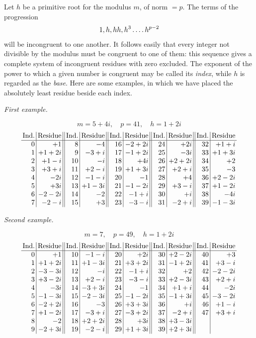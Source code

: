 \newpage
{}
Let $h$ be a primitive root for the modulus $m$, of norm $=p$. The terms of the progression
\[
1,h,hh,h^3\mathinner{.\,.\,.\,.} h^{p-2}
\]
will be incongruent to one another. It follows easily that every integer not divisible by the modulus must be congruent to one of them: this sequence gives a complete system of incongruent residues with zero excluded. The exponent of the power to which a given number is congruent may be called its \emph{index}, while $h$ is regarded as the \emph{base}. Here are some examples, in which we have placed the absolutely least residue beside each index.

\begin{center}\emph{First example.}\end{center}
\[
m=5+4i,\quad p=41,\quad h=1+2i
\]
\begingroup\small
\[
\setlength{\arraycolsep}{2pt}
\begin{array}{r|r||r|r||r|r||r|r||r|r}
\text{Ind.}&\text{Residue}&\text{Ind.}&\text{Residue}&\text{Ind.}&\text{Residue}&\text{Ind.}&\text{Residue}&\text{Ind.}&\text{Residue}\\\hline
0&+1&8&-4&16&-2+2i&24&+2i&32&+1+i\\
1&+1+2i&9&-3+i&17&-1+2i&25&-3i&33&+1+3i\\
2&+1-i&10&-i&18&+4i&26&+2+2i&34&+2\\
3&+3+i&11&+2-i&19&+1+3i&27&+2+i&35&-3\\
4&-2i&12&-1-i&20&-1&28&+4&36&+2-2i\\
5&+3i&13&+1-3i&21&-1-2i&29&+3-i&37&+1-2i\\
6&-2-2i&14&-2&22&-1+i&30&+i&38&-4i\\
7&-2-i&15&+3&23&-3-i&31&-2+i&39&-1-3i
\end{array}
\]
\endgroup

%
\begin{center}\emph{Second example.}\end{center}
\[
m=7,\quad p=49,\quad h=1+2i
\]
\begingroup\small
\[
\setlength{\arraycolsep}{2pt}
\begin{array}{r|r||r|r||r|r||r|r||r|r}
\text{Ind.}&\text{Residue}&\text{Ind.}&\text{Residue}&\text{Ind.}&\text{Residue}&\text{Ind.}&\text{Residue}&\text{Ind.}&\text{Residue}\\\hline
0&+1&10&-1-i&20&+2i&30&+2-2i&40&+3\\
1&+1+2i&11&+1-3i&21&+3+2i&31&-1+2i&41&+3-i\\
2&-3-3i&12&-i&22&-1+i&32&+2&42&-2-2i\\
3&+3-2i&13&+2-i&23&-3-i&33&+2-3i&43&+2+i\\
4&-3i&14&-3+3i&24&-1&34&+1+i&44&-2i\\
5&-1-3i&15&-2-3i&25&-1-2i&35&-1+3i&45&-3-2i\\
6&-2+2i&16&-3&26&+3+3i&36&+i&46&+1-i\\
7&+1-2i&17&-3+i&27&-3+2i&37&-2+i&47&+3+i\\
8&-2&18&+2+2i&28&+3i&38&+3-3i&&\\
9&-2+3i&19&-2-i&29&+1+3i&39&+2+3i&&
\end{array}
\]
\endgroup

